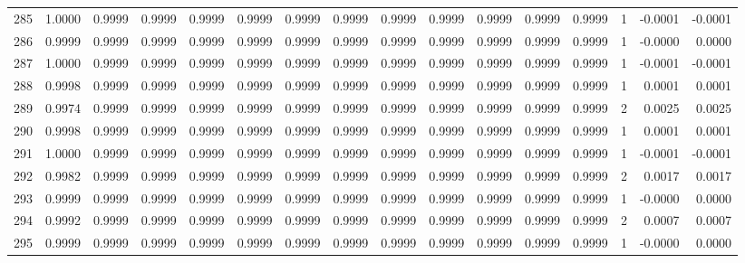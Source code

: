 \begin{tabular}{lrrrrrrrrrrrrrrr}
285 &      1.0000 &  0.9999 &  0.9999 &  0.9999 &  0.9999 &  0.9999 &  0.9999 &  0.9999 &  0.9999 &  0.9999 &   0.9999 &     0.9999 &      1 &                   -0.0001 &                    -0.0001 \\
286 &      0.9999 &  0.9999 &  0.9999 &  0.9999 &  0.9999 &  0.9999 &  0.9999 &  0.9999 &  0.9999 &  0.9999 &   0.9999 &     0.9999 &      1 &                   -0.0000 &                     0.0000 \\
287 &      1.0000 &  0.9999 &  0.9999 &  0.9999 &  0.9999 &  0.9999 &  0.9999 &  0.9999 &  0.9999 &  0.9999 &   0.9999 &     0.9999 &      1 &                   -0.0001 &                    -0.0001 \\
288 &      0.9998 &  0.9999 &  0.9999 &  0.9999 &  0.9999 &  0.9999 &  0.9999 &  0.9999 &  0.9999 &  0.9999 &   0.9999 &     0.9999 &      1 &                    0.0001 &                     0.0001 \\
289 &      0.9974 &  0.9999 &  0.9999 &  0.9999 &  0.9999 &  0.9999 &  0.9999 &  0.9999 &  0.9999 &  0.9999 &   0.9999 &     0.9999 &      2 &                    0.0025 &                     0.0025 \\
290 &      0.9998 &  0.9999 &  0.9999 &  0.9999 &  0.9999 &  0.9999 &  0.9999 &  0.9999 &  0.9999 &  0.9999 &   0.9999 &     0.9999 &      1 &                    0.0001 &                     0.0001 \\
291 &      1.0000 &  0.9999 &  0.9999 &  0.9999 &  0.9999 &  0.9999 &  0.9999 &  0.9999 &  0.9999 &  0.9999 &   0.9999 &     0.9999 &      1 &                   -0.0001 &                    -0.0001 \\
292 &      0.9982 &  0.9999 &  0.9999 &  0.9999 &  0.9999 &  0.9999 &  0.9999 &  0.9999 &  0.9999 &  0.9999 &   0.9999 &     0.9999 &      2 &                    0.0017 &                     0.0017 \\
293 &      0.9999 &  0.9999 &  0.9999 &  0.9999 &  0.9999 &  0.9999 &  0.9999 &  0.9999 &  0.9999 &  0.9999 &   0.9999 &     0.9999 &      1 &                   -0.0000 &                     0.0000 \\
294 &      0.9992 &  0.9999 &  0.9999 &  0.9999 &  0.9999 &  0.9999 &  0.9999 &  0.9999 &  0.9999 &  0.9999 &   0.9999 &     0.9999 &      2 &                    0.0007 &                     0.0007 \\
295 &      0.9999 &  0.9999 &  0.9999 &  0.9999 &  0.9999 &  0.9999 &  0.9999 &  0.9999 &  0.9999 &  0.9999 &   0.9999 &     0.9999 &      1 &                   -0.0000 &                     0.0000 \\

\end{tabular}
